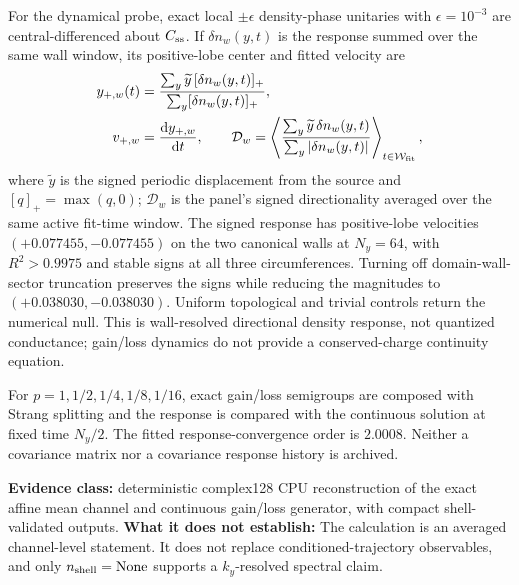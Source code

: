 \documentclass[aps,prb,twocolumn,floatfix,nofootinbib,superscriptaddress]{revtex4-2}
\newcommand{\dd}{\mathrm{d}}
\newcommand{\evidence}[1]{\textbf{Evidence class:} #1}
\newcommand{\limittext}[1]{\textbf{What it does not establish:} #1}
\begin{document}
For the dynamical probe, exact local $\pm\epsilon$ density-phase unitaries with
$\epsilon=10^{-3}$ are central-differenced about $C_{\rm ss}$.  If
$\delta n_w(y,t)$ is the response summed over the same wall window, its positive-lobe
center and fitted velocity are
\begin{align}
 y_{+,w}(t)&=\frac{\sum_y\widetilde y\,[\delta n_w(y,t)]_+}
 {\sum_y[\delta n_w(y,t)]_+},\nonumber\\
 v_{+,w}&=\frac{\dd y_{+,w}}{\dd t},\qquad
 \mathcal D_w=
 \left\langle\frac{\sum_y\widetilde y\,\delta n_w(y,t)}
 {\sum_y|\delta n_w(y,t)|}\right\rangle_{t\in\mathcal W_{\rm fit}},
 \label{eq:mean-response-velocity}
\end{align}
where $\widetilde y$ is the signed periodic displacement from the source and
$[q]_+=\max(q,0)$; $\mathcal D_w$ is the panel's signed directionality averaged over
the same active fit-time window.  The signed response has
positive-lobe velocities $(+0.077455,-0.077455)$ on the two canonical walls at $N_y=64$,
with $R^2>0.9975$ and stable signs at all three circumferences.  Turning off
domain-wall-sector truncation preserves the signs while reducing the magnitudes to
$(+0.038030,-0.038030)$.  Uniform topological and trivial controls return the numerical
null.  This is wall-resolved directional density response, not quantized conductance;
gain/loss dynamics do not provide a conserved-charge continuity equation.

For $p=1,1/2,1/4,1/8,1/16$, exact gain/loss semigroups are composed with Strang splitting
and the response is compared with the continuous solution at fixed time $N_y/2$.  The
fitted response-convergence order is $2.0008$.  Neither a covariance matrix nor a
covariance response history is archived.

\evidence{deterministic complex128 CPU reconstruction of the exact affine mean channel
and continuous gain/loss generator, with compact shell-validated outputs.}
\limittext{The calculation is an averaged channel-level statement.  It does not replace
conditioned-trajectory observables, and only $n_{\rm shell}=\mathrm{None}$ supports a
$k_y$-resolved spectral claim.}
\end{document}
